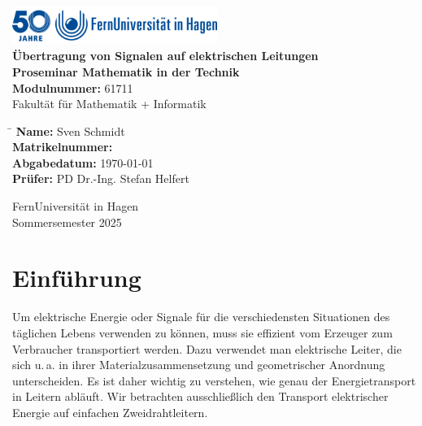\documentclass[paper=a4, parskip=half-, ngerman, fontsize=11pt]{scrreprt}
\begin{document}
\begin{titlepage}
    \begin{center}
        \includegraphics[width=0.5\textwidth]{logo_fernuni_hagen.png}\\[2cm]

        {\LARGE \textbf{Übertragung von Signalen auf elektrischen Leitungen}}\\[2cm]

        \textbf{Proseminar Mathematik in der Technik}\\
        \textbf{Modulnummer:} 61711\\
        Fakultät für Mathematik + Informatik\\[0.5cm]

        \begin{tabbing}
            \hspace{6cm} \= \kill
            \textbf{Name:} \> Sven Schmidt \\
            \textbf{Matrikelnummer:}  \\
            \textbf{Abgabedatum:} \> \today \\
            \textbf{Prüfer:} \> PD Dr.-Ing. Stefan Helfert \\
        \end{tabbing}

        \vfill

        {\large FernUniversität in Hagen}\\
        {\large Sommersemester 2025}
    \end{center}
\end{titlepage}

\chapter{Einführung}
Um elektrische Energie oder Signale für die verschiedensten Situationen des täglichen Lebens verwenden zu können, muss
sie effizient vom Erzeuger zum Verbraucher transportiert werden. Dazu verwendet man elektrische Leiter, die sich u.\,a.
in ihrer Materialzusammensetzung und geometrischer Anordnung unterscheiden. Es ist daher wichtig zu verstehen, wie
genau der Energietransport in Leitern abläuft. Wir betrachten ausschließlich den Transport elektrischer Energie auf
einfachen Zweidrahtleitern.
\end{document}
